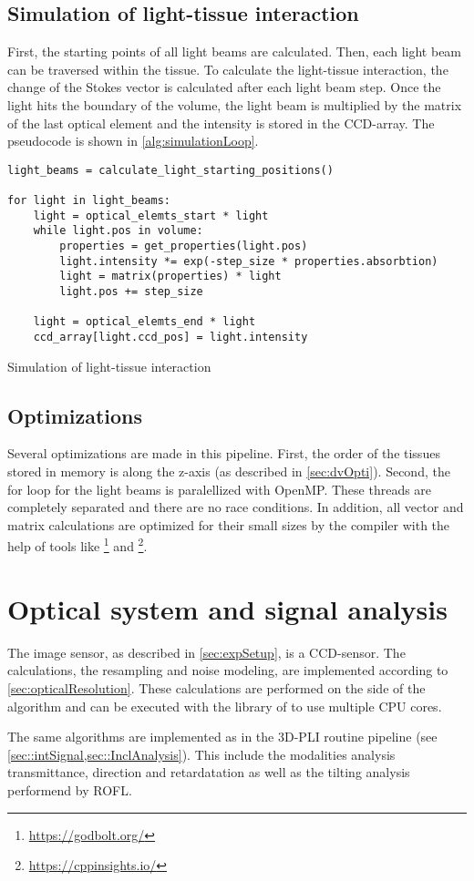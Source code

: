 \subsection{Simulation of light-tissue interaction}
%
First, the starting points of all light beams are calculated.
Then, each light beam can be traversed within the tissue.
To calculate the light-tissue interaction, the change of the Stokes vector is calculated after each light beam step.
Once the light hits the boundary of the volume, the light beam is multiplied by the matrix of the last optical element and the intensity is stored in the \ac{CCD}-array.
The pseudocode is shown in \cref{alg:simulationLoop}.
%
\begin{lstfloat}[!tb]
\lstset{style=python}
\begin{lstlisting}[]
light_beams = calculate_light_starting_positions()

for light in light_beams:
    light = optical_elemts_start * light
    while light.pos in volume:
        properties = get_properties(light.pos)
        light.intensity *= exp(-step_size * properties.absorbtion)
        light = matrix(properties) * light
        light.pos += step_size
   
    light = optical_elemts_end * light
    ccd_array[light.ccd_pos] = light.intensity
\end{lstlisting}
\caption{Simulation of light-tissue interaction}
\label{alg:simulationLoop}
\end{lstfloat}
%
%
%
\subsection{Optimizations}
%
Several optimizations are made in this pipeline.
First, the order of the tissues stored in memory is along the z-axis (as described in \cref{sec:dvOpti}).
Second, the for loop for the light beams is paralellized with \ac{OpenMP}.
These threads are completely separated and there are no race conditions.
In addition, all vector and matrix calculations are optimized for their small sizes by the compiler with the help of tools like \footnote{\url{https://godbolt.org/}} and \footnote{\url{https://cppinsights.io/}}.
%
%
\section{Optical system and signal analysis}
\label{sec:ccdOptic}
%
The image sensor, as described in \cref{sec:expSetup}, is a \ac{CCD}-sensor.
The calculations, \ie the resampling and noise modeling, are implemented according to \cref{sec:opticalResolution}.
These calculations are performed on the \python{} side of the algorithm and can be executed with the  library of \python{} to use multiple \ac{CPU} cores.
\par
%
The same algorithms are implemented as in the \ac{3D-PLI} routine pipeline (see \cref{sec::intSignal,sec::InclAnalysis}).
This include the modalities analysis transmittance, direction and retardatation as well as the tilting analysis performend by \ac{ROFL}.
%
%
%
